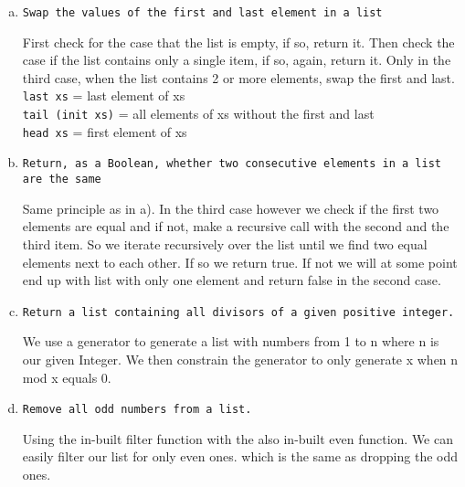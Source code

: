\documentclass{article} %
\begin{document}
\begin{enumerate}[a)]
\item \verb|Swap the values of the first and last element in a list|\\
\lstset{language=Haskell}


First check for the case that the list is empty, if so, return it. Then check the case if the list contains only a single item, if so, again, return it. Only in the third case, when the list contains 2 or more elements, swap the first and last.\\
\verb|last xs| = last element of xs\\
\verb|tail (init xs)| = all elements of xs without the first and last\\
\verb|head xs| = first element of xs \\

\item \verb|Return, as a Boolean, whether two consecutive elements in a list are the same|\\
\lstset{language=Haskell}


Same principle as in a). In the third case however we check if the first two elements are equal and if not, make a recursive call with the second and the third item. So we iterate recursively over the list until we find two equal elements next to each other. If so we return true. If not we will at some point end up with list with only one element and return false in the second case. \\

\item \verb|Return a list containing all divisors of a given positive integer.|\\
\lstset{language=Haskell}


We use a generator to generate a list with numbers from 1 to n where n is our given Integer. We then constrain the generator to only generate x when n mod x equals 0. \\
\clearpage
\item \verb|Remove all odd numbers from a list.|\\
\lstset{language=Haskell}


Using the in-built filter function with the also in-built even function. We can easily filter our list for only even ones. which is the same as dropping the odd ones.  \\


\end{enumerate}
\end{document}
